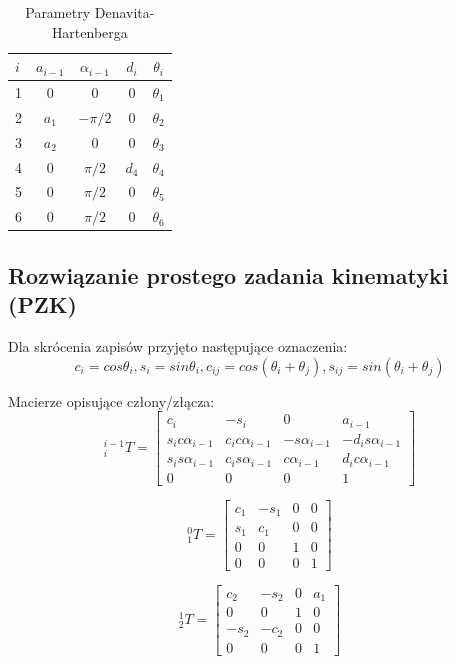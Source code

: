\documentclass{article}
\begin{document}
\begin{table}[H]
\centering
\caption{Parametry Denavita-Hartenberga}
\label{tab::parametry_DH}
\begin{tabular}{|l|c|c|c|c|}
\hline
$i$	&$a_{i-1}$	&$\alpha_{i-1}$	&$d_i$	&$\theta_i$	\\ \hline
1	&0		&0			&0		&$\theta_1$  \\ \hline
2	&$a_1$	&$-\pi/2$		&0		&$\theta_2$  \\ \hline
3	&$a_2$	&0			&0		&$\theta_3$  \\ \hline
4	&0		&$\pi/2$		&$d_4$	&$\theta_4$  \\ \hline
5	&0		&$\pi/2$		&0		&$\theta_5$  \\ \hline
6	&0		&$\pi/2$		&0		&$\theta_6$  \\ \hline
\end{tabular}
\end{table}

\subsection{Rozwiązanie prostego zadania kinematyki (PZK)}

Dla skrócenia zapisów przyjęto następujące oznaczenia:
\[ c_i = cos\theta_i, s_i = sin\theta_i, c_{i j} = cos(\theta_i+\theta_j), s_{i j} = sin (\theta_i + \theta_j) \]

Macierze opisujące człony/złącza:
\[
_{i}^{i-1}T=
\begin{bmatrix}
c_i	&-s_i	&0	&a_{i-1}	\\
s_i c\alpha_{i-1}	&c_i c\alpha_{i-1}	&-s\alpha_{i-1}	&-d_i s\alpha_{i-1}	\\
s_i s\alpha_{i-1}	&c_i s\alpha_{i-1}	& c\alpha_{i-1}	&d_i c\alpha_{i-1}	\\
0	&0	&0	&1	
 \end{bmatrix}
\]

\[
_{1}^{0}T=
\begin{bmatrix}
c_1	&-s_1	&0	&0	\\
s_1	&c_1	&0	&0	\\
0	&0	&1	&0	\\
0	&0	&0	&1	
 \end{bmatrix}
\]

\[
_{2}^{1}T=
\begin{bmatrix}
c_2	&-s_2	&0	&a_1	\\
0	&0	&1	&0	\\
-s_2	&-c_2	&0	&0	\\
0	&0	&0	&1	
 \end{bmatrix}
\]
\end{document}

